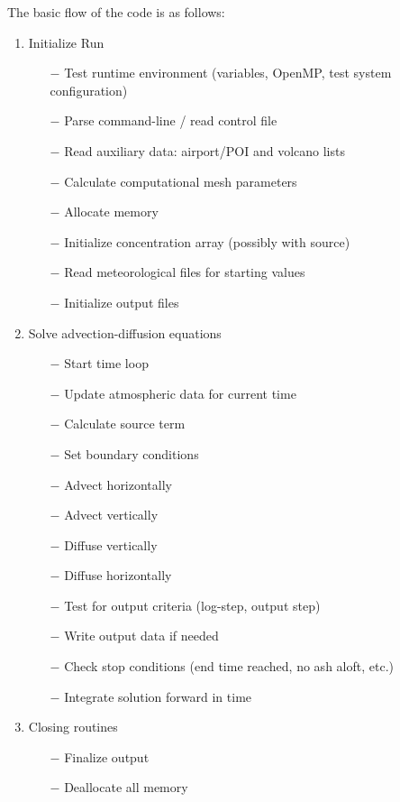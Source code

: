 The basic flow of the code is as follows:
\begin{enumerate}
 \item Initialize Run
 \begin{itemize}
  \item[$-$] Test runtime environment (variables, OpenMP, test system configuration)
  \item[$-$] Parse command-line / read control file
  \item[$-$] Read auxiliary data: airport/POI and volcano lists
  \item[$-$] Calculate computational mesh parameters
  \item[$-$] Allocate memory
  \item[$-$] Initialize concentration array (possibly with source)
  \item[$-$] Read meteorological files for starting values
  \item[$-$] Initialize output files
 \end{itemize}
 \item Solve advection-diffusion equations
 \begin{itemize}
  \item[$-$] Start time loop
  \item[$-$] Update atmospheric data for current time
  \item[$-$] Calculate source term
  \item[$-$] Set boundary conditions
  \item[$-$] Advect horizontally
  \item[$-$] Advect vertically
  \item[$-$] Diffuse vertically
  \item[$-$] Diffuse horizontally
  \item[$-$] Test for output criteria (log-step, output step)
  \item[$-$] Write output data if needed
  \item[$-$] Check stop conditions (end time reached, no ash aloft, etc.)
  \item[$-$] Integrate solution forward in time
 \end{itemize}
 \item Closing routines
 \begin{itemize}
  \item[$-$] Finalize output
  \item[$-$] Deallocate all memory
 \end{itemize}
\end{enumerate}


